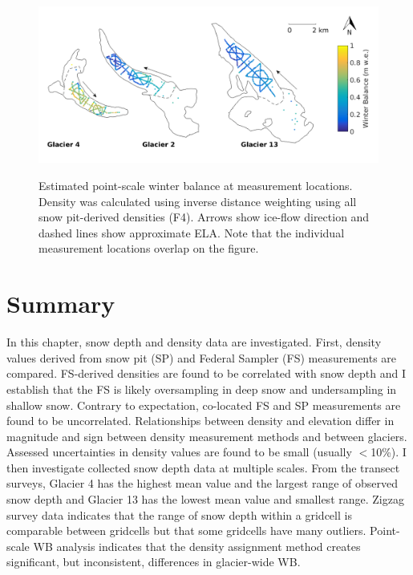\documentclass{sfuthesis}
\begin{document}
\begin{figure}[H]
	\centering
	\includegraphics[width =\textwidth]{SWEmap_opt9.png}\\
	\caption{Estimated point-scale winter balance at measurement locations. Density was calculated using inverse distance weighting using all snow pit-derived densities (F4). Arrows show ice-flow direction and dashed lines show approximate ELA. Note that the individual measurement locations overlap on the figure.}
	\label{fig:SWEmap_F4}
\end{figure}


\section{Summary}

In this chapter, snow depth and density data are investigated. First, density values derived from snow pit (SP) and Federal Sampler (FS) measurements are compared. FS-derived densities are found to be correlated with snow depth and I establish that the FS is likely oversampling in deep snow and undersampling in shallow snow. Contrary to expectation, co-located FS and SP measurements are found to be uncorrelated. Relationships between density and elevation differ in magnitude and sign between density measurement methods and between glaciers. Assessed uncertainties in density values are found to be small (usually $<$10\%). I then investigate collected snow depth data at multiple scales. From the transect surveys, Glacier 4 has the highest mean value and the largest range of observed snow depth and Glacier 13 has the lowest mean value and smallest range. Zigzag survey data indicates that the range of snow depth within a gridcell is comparable between gridcells but that some gridcells have many outliers. Point-scale WB analysis indicates that the density assignment method creates significant, but inconsistent, differences in glacier-wide WB. 
\end{document}
